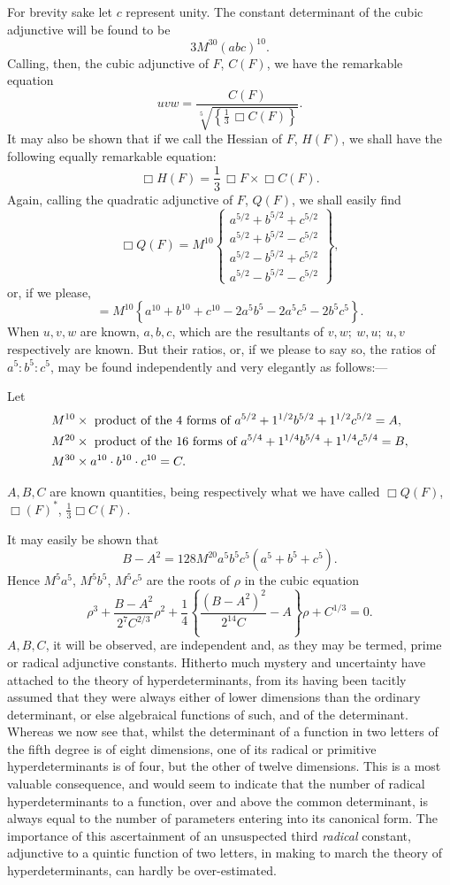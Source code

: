 \documentclass[11pt]{article}
\newcommand{\sourcepage}[1]{\marginpar{\scriptsize p.~#1}}
\begin{document}
{{For brevity sake let $c$ represent unity. The constant determinant of the cubic adjunctive will be found to be
\[
 3M^{30}(abc)^{10}.
\]
Calling, then, the cubic adjunctive of $F$, $C(F)$, we have the remarkable equation
\[
 uvw=\frac{C(F)}{\sqrt[5]{\left\{\frac13\,\Box C(F)\right\}}}.
\]
It may also be shown that if we call the Hessian of $F$, $H(F)$, we shall have the following equally remarkable equation:
\[
 \Box H(F)=\frac13\,\Box F\times\Box C(F).
\]
Again, calling the quadratic adjunctive of $F$, $Q(F)$, we shall easily find
\[
 \Box Q(F)=M^{10}
 \left\{
 \begin{array}{c}
 a^{5/2}+b^{5/2}+c^{5/2}\\
 a^{5/2}+b^{5/2}-c^{5/2}\\
 a^{5/2}-b^{5/2}+c^{5/2}\\
 a^{5/2}-b^{5/2}-c^{5/2}
 \end{array}
 \right\},
\]
or, if we please,
\[
 =M^{10}\left\{a^{10}+b^{10}+c^{10}-2a^5b^5-2a^5c^5-2b^5c^5\right\}.
\]
When $u,v,w$ are known, $a,b,c$, which are the resultants of $v,w;\ w,u;\ u,v$ respectively are known. But their ratios, or, if we please to say so, the ratios of $a^5:b^5:c^5$, may be found independently and very elegantly as follows:---

Let
\[
\begin{aligned}
&M^{10}\times\hbox{ product of the 4 forms of }
 a^{5/2}+1^{1/2}b^{5/2}+1^{1/2}c^{5/2}=A,\\
&M^{20}\times\hbox{ product of the 16 forms of }
 a^{5/4}+1^{1/4}b^{5/4}+1^{1/4}c^{5/4}=B,\\
&M^{30}\times a^{10}\cdot b^{10}\cdot c^{10}=C.
\end{aligned}
\]

\sourcepage{205}
$A,B,C$ are known quantities, being respectively what we have called $\Box Q(F)$, $\Box(F)^*$, $\frac13\Box C(F)$.

It may easily be shown that
\[
 B-A^2=128M^{20}a^5b^5c^5(a^5+b^5+c^5).
\]
Hence $M^5a^5$, $M^5b^5$, $M^5c^5$ are the roots of $\rho$ in the cubic equation
\[
 \rho^3+\frac{B-A^2}{2^7C^{2/3}}\rho^2
 +\frac14\left\{\frac{(B-A^2)^2}{2^{14}C}-A\right\}\rho
 +C^{1/3}=0.
\]
$A,B,C$, it will be observed, are independent and, as they may be termed, prime or radical adjunctive constants. Hitherto much mystery and uncertainty have attached to the theory of hyperdeterminants, from its having been tacitly assumed that they were always either of lower dimensions than the ordinary determinant, or else algebraical functions of such, and of the determinant. Whereas we now see that, whilst the determinant of a function in two letters of the fifth degree is of eight dimensions, one of its radical or primitive hyperdeterminants is of four, but the other of twelve dimensions. This is a most valuable consequence, and would seem to indicate that the number of radical hyperdeterminants to a function, over and above the common determinant, is always equal to the number of parameters entering into its canonical form. The importance of this ascertainment of an unsuspected third \emph{radical} constant, adjunctive to a quintic function of two letters, in making to march the theory of hyperdeterminants, can hardly be over-estimated.

}}
\end{document}
